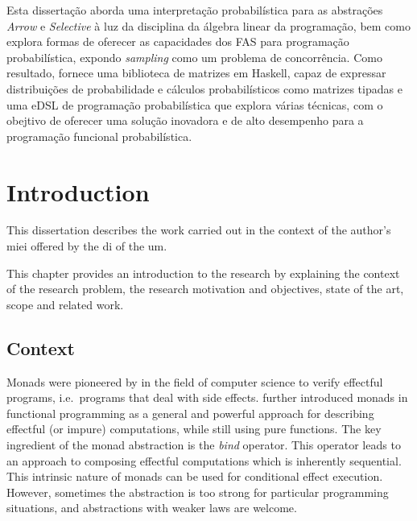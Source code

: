\documentclass[
  oneside,
  11pt, a4paper,
  footinclude=true,
  headinclude=true,
  cleardoublepage=empty
]{scrbook}
\theoremstyle{definition}
\theoremstyle{definition}
\begin{document}
    Esta dissertação aborda uma interpretação probabilística para as abstrações \emph{Arrow} e \emph{Selective} à luz da disciplina da álgebra linear da programação, bem como explora formas de oferecer as capacidades dos FAS para programação probabilística, expondo \emph{sampling} como um problema de concorrência. Como resultado, fornece uma biblioteca de matrizes em Haskell, capaz de expressar distribuições de probabilidade e cálculos probabilísticos como matrizes tipadas e uma eDSL de programação probabilística que explora várias técnicas, com o obejtivo de oferecer uma solução inovadora e de alto desempenho para a programação funcional probabilística.
	
	\vskip0.5cm
    
	\tableofcontents
	\listoffigures
	\listoftables
	\lstlistoflistings
    \renewcommand{\listtheoremname}{List of theorems and definitions}
	\printglossary[type=\acronymtype]
	\clearpage
	\thispagestyle{empty}

	
	\chapter{Introduction}
        This dissertation describes the work carried out in the context of the author's \gls{miei} offered by the \gls{di} of the \gls{um}.
        
        This chapter provides an introduction to the research by explaining the context of the research problem, the research motivation and objectives, state of the art, scope and related work.
        
    \section{Context}\label{sec-context}
    
    Monads were pioneered by \cite{Moggi:1991:NCM:116981.116984} in the field of computer science to verify effectful programs, i.e.\ programs that deal with side effects. \cite{Wadler:1989:TF:99370.99404} further introduced monads in functional programming as a general and powerful approach for describing effectful (or impure) computations, while still using pure functions. The key ingredient of the monad abstraction is the \textit{bind} operator. This operator leads to an approach to composing effectful computations which is inherently sequential. This intrinsic nature of monads can be used for conditional effect execution. However, sometimes the abstraction is too strong for particular programming situations, and abstractions with weaker laws are welcome.
\end{document}
